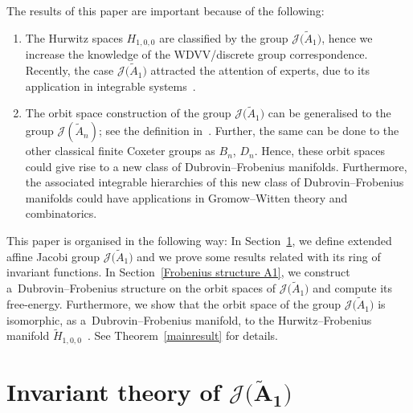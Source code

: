 \documentclass[pdftex]{sigma}%
\numberwithin{equation}{section}
\newcommand{\Ja}{\mathcal{J}}
\begin{document}
The results of this paper are important because of the following:
 \begin{enumerate}\itemsep=0pt
\item The Hurwitz spaces $H_{1,0,0}$ are classified by the group $\Ja\big(\tilde A_1\big)$, hence we increase the know\-ledge of the WDVV/discrete group correspondence. Recently, the case $\Ja\big(\tilde A_1\big)$ attracted the attention of experts, due to its application in integrable systems~\cite{M.CutimancoandV.Shramchenko, E.V.FerapontovM.V.PavlovL.Xue, Romano1}.

\item The orbit space construction of the group $\Ja\big(\tilde A_1\big)$ can be generalised to the group $\Ja(\tilde A_n)$; see the definition in~\cite{GAlmeida}. Further, the same can be done to the other classical finite Coxeter groups as $B_n$, $D_n$. Hence, these orbit spaces could give rise to a new class of Dubrovin--Frobenius manifolds. Furthermore, the associated integrable hierarchies of this new class of Dubrovin--Frobenius manifolds could have applications in Gromow--Witten theory and combinatorics.
\end{enumerate}

This paper is organised in the following way: In Section~\ref{invariant theory}, we define extended affine Jacobi group $\Ja\big(\tilde A_1\big)$ and we prove some results related with its ring of invariant functions. In Section~\ref{Frobenius structure A1}, we construct a~Dubrovin--Frobenius structure on the orbit spaces of $\Ja\big(\tilde A_1\big)$ and compute its free-energy. Furthermore, we show that the orbit space of the group $\Ja\big(\tilde A_1\big)$ is isomorphic, as a~Dubrovin--Frobenius manifold, to the Hurwitz--Frobenius manifold $\tilde H_{1,0,0}$~\cite{B.Dubrovin2, V.Shramchenko}. See Theorem~\ref{mainresult} for details.


\section[Invariant theory of J(A1)]
{Invariant theory of $\boldsymbol{\Ja\big(\tilde A_1\big)}$}\label{invariant theory}
\end{document}
